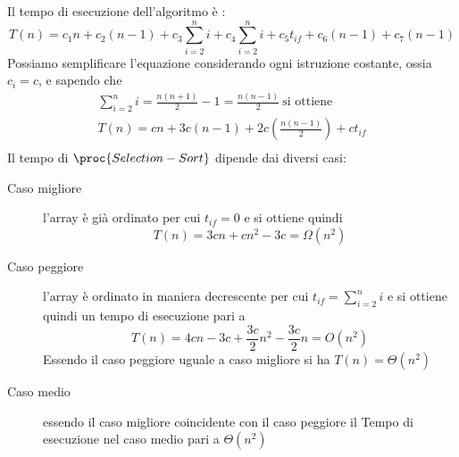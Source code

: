 Il tempo di esecuzione dell'algoritmo è :
\begin{equation*}
    T(n) = c_1n + c_2(n-1) + c_3 \sum _{i = 2} ^{n} i + c_4 \sum _{i = 2} ^ n i +
           c_5t_{if} + c_6(n-1) + c_7(n-1)
\end{equation*}
Possiamo semplificare l'equazione considerando ogni istruzione costante, ossia $c_i = c$, e sapendo che
\begin{align*}
  \sum _{i = 2} ^{n} i = \frac{n(n+1)}{2} - 1 = \frac{n(n-1)}{2} \ \text{si ottiene}\\
  T(n) = cn + 3c(n-1) + 2c(\frac{n(n-1)}{2}) + c t_{if} \\
\end{align*}
Il tempo di $\proc{Selection-Sort}$ dipende dai diversi casi:
\begin{description}
  \item [Caso migliore] l'array è già ordinato per cui $t_{if} = 0$ e si ottiene quindi
        \begin{equation*}
          T(n) = 3cn + cn^2 - 3c = \Omega(n^2)
        \end{equation*}
  \item [Caso peggiore]l'array è ordinato in maniera decrescente per cui $\displaystyle t_{if} = \sum _{i = 2} ^{n} i$
        e si ottiene quindi un tempo di esecuzione pari a
        \begin{equation*}
          T(n) = 4cn - 3c + \frac{3c}{2}n^2 - \frac{3c}{2}n = O(n^2)
        \end{equation*}
        Essendo il caso peggiore uguale a caso migliore si ha $T(n) = \Theta(n^2)$
  \item [Caso medio] essendo il caso migliore coincidente con il caso peggiore il Tempo
        di esecuzione nel caso medio pari a $\Theta(n^2)$
\end{description}
